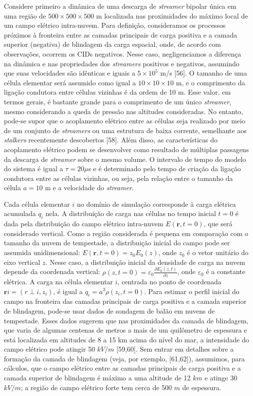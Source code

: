 \documentclass[a4paper, 12pt, onecolumn,singlespacing]{article}
\begin{document}
	Considere primeiro a dinâmica de uma descarga de \textit{streamer} bipolar única em uma região de $500 \times 500 \times 500$ m localizada nas proximidades do máximo local de um campo elétrico intra-nuvem. Para definição, consideramos os processos próximos à fronteira entre as camadas principais de carga positiva e a camada superior (negativa) de blindagem da carga espacial, onde, de acordo com observações, ocorrem os CIDs negativos. Nesse caso, negligenciamos a diferença na dinâmica e nas propriedades dos \textit{streamers} positivos e negativos, assumindo que suas velocidades são idênticas e iguais a $5 \times 10^5$ m/s [56]. O tamanho de uma célula elementar será assumido como igual a $10 \times 10 \times 10$ m, e o comprimento da ligação condutora entre células vizinhas é da ordem de 10 m. Esse valor, em termos gerais, é bastante grande para o comprimento de um único \textit{streamer}, mesmo considerando a queda de pressão nas altitudes consideradas. No entanto, pode-se supor que o acoplamento elétrico entre as células seja realizado por meio de um conjunto de \textit{streamers} ou uma estrutura de baixa corrente, semelhante aos \textit{stalkers} recentemente descobertos [58]. Além disso, as características do acoplamento elétrico podem se desenvolver como resultado de múltiplas passagens da descarga de \textit{streamer} sobre o mesmo volume. O intervalo de tempo do modelo do sistema é igual a $\tau = 20 \mu$s e é determinado pelo tempo de criação da ligação condutora entre as células vizinhas, ou seja, pela relação entre o tamanho da célula $a = 10$ m e a velocidade do \textit{streamer}.
	
	Cada célula elementar $i$ no domínio de simulação corresponde à carga elétrica acumulada $q_i$ nela. A distribuição de carga nas células no tempo inicial $t = 0$ é dada pela distribuição do campo elétrico intra-nuvem $E(\mathbf{r}, t = 0)$, que será considerado vertical. Como a região considerada é pequena em comparação com o tamanho da nuvem de tempestade, a distribuição inicial do campo pode ser assumida unidimensional: $E(\mathbf{r}, t = 0) = z_0 E_0(z)$, onde $z_0$ é o vetor unitário do eixo vertical $z$. Nesse caso, a distribuição inicial da densidade de carga na nuvem depende da coordenada vertical: $\rho(z, t = 0) = \varepsilon_0 \frac{\partial E_0(z, t)}{\partial z}$, onde $\varepsilon_0$ é a constante elétrica. A carga na célula elementar $i$, centrada no ponto de coordenada $\mathbf{r}i = (r{\perp i}, z_i)$, é igual a $q_i = a^3 \rho(z_i, t = 0)$. Para estimar o perfil inicial do campo na fronteira das camadas principais de carga positiva e a camada superior de blindagem, pode-se usar dados de sondagem de balão em nuvens de tempestade. Esses dados sugerem que nas proximidades da camada de blindagem, que varia de algumas centenas de metros a mais de um quilômetro de espessura e está localizada em altitudes de 8 a 15 km acima do nível do mar, a intensidade do campo elétrico pode atingir 50 $kV/m$ [59,60]. Sem entrar em detalhes sobre a formação da camada de blindagem (veja, por exemplo, [61,62]), assumimos, para cálculos, que o campo elétrico entre as camadas principais de carga positiva e a camada superior de blindagem é máximo a uma altitude de 12 $km$ e atinge 30 $kV/m$; a região de campo elétrico forte tem cerca de 500 $m$ de espessura.
	
\end{document}
